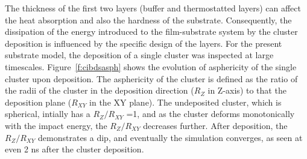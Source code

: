\begin{selfcite}
The thickness of the first two layers (buffer and thermostatted layers) can affect the heat absorption and also the hardness of the substrate. Consequently, the dissipation of the energy introduced to the film-substrate system by the cluster deposition is influenced by the specific design of the layers. For the present substrate model, the deposition of a single cluster was inspected at large timescales. Figure~\ref{f:cibdsasph} shows the evolution of asphericity of the single cluster upon deposition. The asphericity of the cluster is defined as the ratio of the radii of the cluster in the deposition direction ($R_{Z}$ in Z-axis) to that the deposition plane ($R_{XY}$ in the XY plane). The undeposited cluster, which is spherical, intially has a $R_{Z}/R_{XY}$ =1, and as the cluster deforms monotonically with the impact energy, the $R_{Z}/R_{XY}$ decreases further. After deposition, the $R_{Z}/R_{XY}$ demonstrates a dip, and eventually the simulation converges, as seen at even 2 ns after the cluster deposition. \par
\end{selfcite}

